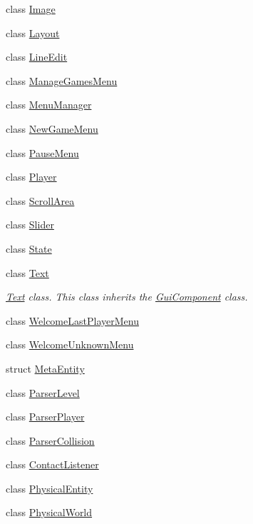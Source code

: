 \begin{DoxyCompactItemize}
class \hyperlink{class_symp_1_1_image}{Image}
\item 
class \hyperlink{class_symp_1_1_layout}{Layout}
\item 
class \hyperlink{class_symp_1_1_line_edit}{Line\-Edit}
\item 
class \hyperlink{class_symp_1_1_manage_games_menu}{Manage\-Games\-Menu}
\item 
class \hyperlink{class_symp_1_1_menu_manager}{Menu\-Manager}
\item 
class \hyperlink{class_symp_1_1_new_game_menu}{New\-Game\-Menu}
\item 
class \hyperlink{class_symp_1_1_pause_menu}{Pause\-Menu}
\item 
class \hyperlink{class_symp_1_1_player}{Player}
\item 
class \hyperlink{class_symp_1_1_scroll_area}{Scroll\-Area}
\item 
class \hyperlink{class_symp_1_1_slider}{Slider}
\item 
class \hyperlink{class_symp_1_1_state}{State}
\item 
class \hyperlink{class_symp_1_1_text}{Text}
\begin{DoxyCompactList}\small\item\em \hyperlink{class_symp_1_1_text}{Text} class. This class inherits the \hyperlink{class_symp_1_1_gui_component_a22124675c2976983ac18374f81cc3fb3}{Gui\-Component} class. \end{DoxyCompactList}\item 
class \hyperlink{class_symp_1_1_welcome_last_player_menu}{Welcome\-Last\-Player\-Menu}
\item 
class \hyperlink{class_symp_1_1_welcome_unknown_menu}{Welcome\-Unknown\-Menu}
\item 
struct \hyperlink{struct_symp_1_1_meta_entity}{Meta\-Entity}
\item 
class \hyperlink{struct_symp_1_1_parser_level}{Parser\-Level}
\item 
class \hyperlink{class_symp_1_1_parser_player}{Parser\-Player}
\item 
class \hyperlink{struct_symp_1_1_parser_collision}{Parser\-Collision}
\item 
class \hyperlink{class_symp_1_1_contact_listener}{Contact\-Listener}
\item 
class \hyperlink{class_symp_1_1_physical_entity}{Physical\-Entity}
\item 
class \hyperlink{class_symp_1_1_physical_world}{Physical\-World}
\item 

\end{DoxyCompactItemize}
